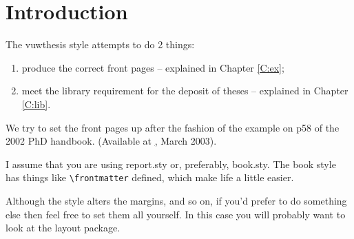 \chapter{Introduction}\label{C:intro}
The \textsf{vuwthesis} style attempts to do 2 things:
\begin{enumerate}
\item produce the correct front pages -- explained in Chapter \ref{C:ex};
\item meet the library requirement for the deposit of theses -- explained in Chapter \ref{C:lib}.
\end{enumerate}

We try to set the front pages up after the fashion of the example on p58
of the 2002 PhD handbook. (Available at
\href{http://www2.vuw.ac.nz/home/publications/phd_handbook.pdf}, March
2003).

I assume that you are using \textsf{report.sty} or, preferably,
\textsf{book.sty}. The book style has things like \verb+\frontmatter+
defined, which make life a little easier.

Although the style alters the margins, and so on,  if you'd prefer to do
something else then feel free to set them all yourself. In this case you
will probably want to look at the \textsf{layout} package.
